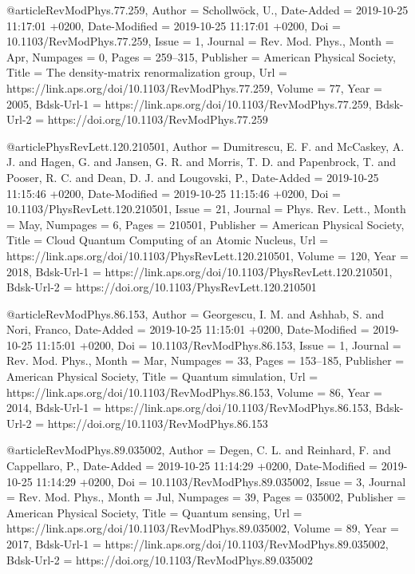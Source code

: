 \documentclass[epj,final]{svjour}
\begin{document}
@article{RevModPhys.77.259,
	Author = {Schollw\"ock, U.},
	Date-Added = {2019-10-25 11:17:01 +0200},
	Date-Modified = {2019-10-25 11:17:01 +0200},
	Doi = {10.1103/RevModPhys.77.259},
	Issue = {1},
	Journal = {Rev. Mod. Phys.},
	Month = {Apr},
	Numpages = {0},
	Pages = {259--315},
	Publisher = {American Physical Society},
	Title = {The density-matrix renormalization group},
	Url = {https://link.aps.org/doi/10.1103/RevModPhys.77.259},
	Volume = {77},
	Year = {2005},
	Bdsk-Url-1 = {https://link.aps.org/doi/10.1103/RevModPhys.77.259},
	Bdsk-Url-2 = {https://doi.org/10.1103/RevModPhys.77.259}}

@article{PhysRevLett.120.210501,
	Author = {Dumitrescu, E. F. and McCaskey, A. J. and Hagen, G. and Jansen, G. R. and Morris, T. D. and Papenbrock, T. and Pooser, R. C. and Dean, D. J. and Lougovski, P.},
	Date-Added = {2019-10-25 11:15:46 +0200},
	Date-Modified = {2019-10-25 11:15:46 +0200},
	Doi = {10.1103/PhysRevLett.120.210501},
	Issue = {21},
	Journal = {Phys. Rev. Lett.},
	Month = {May},
	Numpages = {6},
	Pages = {210501},
	Publisher = {American Physical Society},
	Title = {Cloud Quantum Computing of an Atomic Nucleus},
	Url = {https://link.aps.org/doi/10.1103/PhysRevLett.120.210501},
	Volume = {120},
	Year = {2018},
	Bdsk-Url-1 = {https://link.aps.org/doi/10.1103/PhysRevLett.120.210501},
	Bdsk-Url-2 = {https://doi.org/10.1103/PhysRevLett.120.210501}}

@article{RevModPhys.86.153,
	Author = {Georgescu, I. M. and Ashhab, S. and Nori, Franco},
	Date-Added = {2019-10-25 11:15:01 +0200},
	Date-Modified = {2019-10-25 11:15:01 +0200},
	Doi = {10.1103/RevModPhys.86.153},
	Issue = {1},
	Journal = {Rev. Mod. Phys.},
	Month = {Mar},
	Numpages = {33},
	Pages = {153--185},
	Publisher = {American Physical Society},
	Title = {Quantum simulation},
	Url = {https://link.aps.org/doi/10.1103/RevModPhys.86.153},
	Volume = {86},
	Year = {2014},
	Bdsk-Url-1 = {https://link.aps.org/doi/10.1103/RevModPhys.86.153},
	Bdsk-Url-2 = {https://doi.org/10.1103/RevModPhys.86.153}}

@article{RevModPhys.89.035002,
	Author = {Degen, C. L. and Reinhard, F. and Cappellaro, P.},
	Date-Added = {2019-10-25 11:14:29 +0200},
	Date-Modified = {2019-10-25 11:14:29 +0200},
	Doi = {10.1103/RevModPhys.89.035002},
	Issue = {3},
	Journal = {Rev. Mod. Phys.},
	Month = {Jul},
	Numpages = {39},
	Pages = {035002},
	Publisher = {American Physical Society},
	Title = {Quantum sensing},
	Url = {https://link.aps.org/doi/10.1103/RevModPhys.89.035002},
	Volume = {89},
	Year = {2017},
	Bdsk-Url-1 = {https://link.aps.org/doi/10.1103/RevModPhys.89.035002},
	Bdsk-Url-2 = {https://doi.org/10.1103/RevModPhys.89.035002}}
\end{document}
